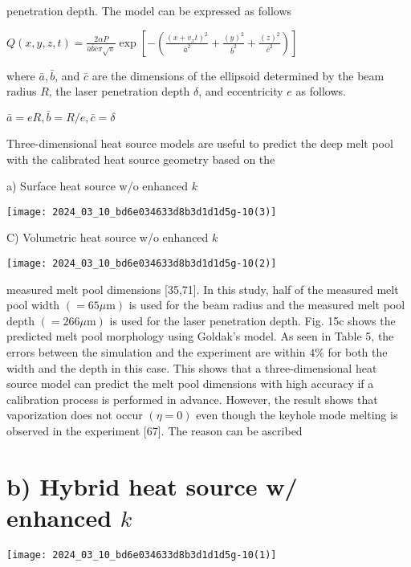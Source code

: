 \documentclass[10pt]{article}
\begin{document}
penetration depth. The model can be expressed as follows

$Q(x, y, z, t)=\frac{2 \alpha P}{\bar{a} \bar{b} \bar{c} \pi \sqrt{\pi}} \exp \left[-\left(\frac{\left(x+v_{x} t\right)^{2}}{\bar{a}^{2}}+\frac{(y)^{2}}{\bar{b}^{2}}+\frac{(z)^{2}}{\bar{c}^{2}}\right)\right]$

where $\bar{a}, \bar{b}$, and $\bar{c}$ are the dimensions of the ellipsoid determined by the beam radius $R$, the laser penetration depth $\delta$, and eccentricity $e$ as follows.

$\bar{a}=e R, \bar{b}=R / e, \bar{c}=\delta$

Three-dimensional heat source models are useful to predict the deep melt pool with the calibrated heat source geometry based on the

a) Surface heat source w/o enhanced $k$

\begin{center}
\texttt{[image: 2024\_03\_10\_bd6e034633d8b3d1d1d5g-10(3)]}
\end{center}

C) Volumetric heat source w/o enhanced $k$

\begin{center}
\texttt{[image: 2024\_03\_10\_bd6e034633d8b3d1d1d5g-10(2)]}
\end{center}

measured melt pool dimensions [35,71]. In this study, half of the measured melt pool width $(=65 \mu \mathrm{m})$ is used for the beam radius and the measured melt pool depth $(=266 \mu \mathrm{m})$ is used for the laser penetration depth. Fig. 15c shows the predicted melt pool morphology using Goldak's model. As seen in Table 5, the errors between the simulation and the experiment are within $4 \%$ for both the width and the depth in this case. This shows that a three-dimensional heat source model can predict the melt pool dimensions with high accuracy if a calibration process is performed in advance. However, the result shows that vaporization does not occur $(\eta=0)$ even though the keyhole mode melting is observed in the experiment [67]. The reason can be ascribed

\section*{b) Hybrid heat source w/ enhanced $k$}
\begin{center}
\texttt{[image: 2024\_03\_10\_bd6e034633d8b3d1d1d5g-10(1)]}
\end{center}
\end{document}
